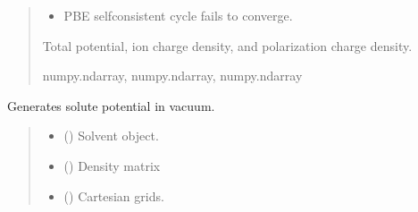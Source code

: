 \documentclass[letterpaper,10pt,english]{sphinxmanual}
\begin{document}
\begin{fulllineitems}
\begin{fulllineitems}
\begin{quote}
\begin{description}
\begin{itemize}
\item {} 
\sphinxAtStartPar
{} \textendash{} PBE self\sphinxhyphen{}consistent cycle fails to converge.

\end{itemize}

\sphinxAtStartPar
Total potential, ion charge density, and polarization charge density.

\sphinxAtStartPar
numpy.ndarray, numpy.ndarray, numpy.ndarray

\end{description}\end{quote}

\end{fulllineitems}


\begin{fulllineitems}
\label{\detokenize{fcdft.solvent:fcdft.solvent.pbe.PBE.make_phi_sol}}
\pysigstartsignatures
\pysiglinewithargsret
{}
{\sphinxparamcomma {}}
{}
\pysigstopsignatures
\sphinxAtStartPar
Generates solute potential in vacuum.
\begin{quote}\begin{description}
\begin{itemize}
\item {} 
\sphinxAtStartPar
{} ({\hyperref[\detokenize{fcdft.solvent:fcdft.solvent.pbe.PBE}]{}}) \textendash{} Solvent object.

\item {} 
\sphinxAtStartPar
{} () \textendash{} Density matrix

\item {} 
\sphinxAtStartPar
{} () \textendash{} Cartesian grids.

\end{itemize}


\end{description}
\end{quote}
\end{fulllineitems}
\end{fulllineitems}
\end{document}
